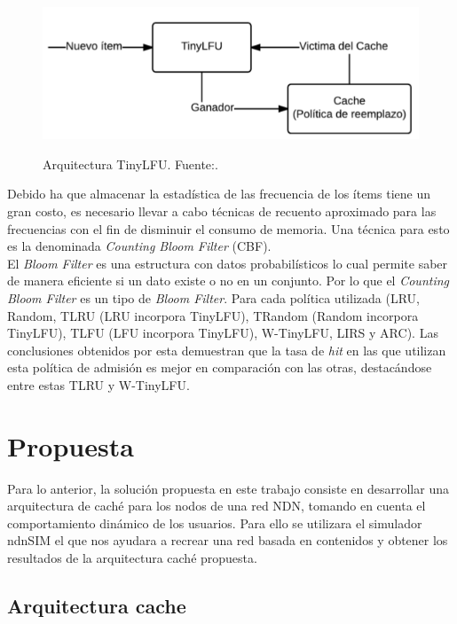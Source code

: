 \documentclass[12pt]{ociamthesis}  %
\begin{document}
\begin{figure}[!htb]
	\centering
	\includegraphics[width=12cm]{Imagenes/Politica_TinyLFU}\\
	\caption{Arquitectura TinyLFU. Fuente:.\cite{einziger2014tinylfu}}
	\label{clasificacion_consulta_cc_uc}
\end{figure}

Debido ha que almacenar la estadística de las frecuencia de los ítems tiene un gran costo, es necesario llevar a cabo técnicas de recuento aproximado para las frecuencias con el fin de disminuir el consumo de memoria. Una técnica para esto es la denominada \textit{Counting Bloom Filter} (CBF).\\

El \textit{Bloom Filter} es una estructura con datos probabilísticos lo cual permite saber de manera eficiente si un dato existe o no en un conjunto. Por lo que el \textit{Counting Bloom Filter} es un tipo de \textit{Bloom Filter}.
Para cada política utilizada (LRU, Random, TLRU (LRU incorpora TinyLFU), TRandom (Random incorpora TinyLFU), TLFU (LFU incorpora TinyLFU), W-TinyLFU, LIRS y ARC). Las conclusiones obtenidos por esta demuestran que la tasa de \textit{hit} en las que utilizan esta política de admisión es mejor en comparación con las otras, destacándose entre estas TLRU y W-TinyLFU.\\

\chapter{Propuesta}
Para lo anterior, la solución propuesta en este trabajo consiste en desarrollar una arquitectura de caché para los nodos de una red NDN, tomando en cuenta el comportamiento dinámico de los usuarios. Para ello se utilizara el simulador ndnSIM el que nos ayudara a recrear una red basada en contenidos y obtener los resultados de la arquitectura caché propuesta.

\section{Arquitectura cache}
\end{document}
